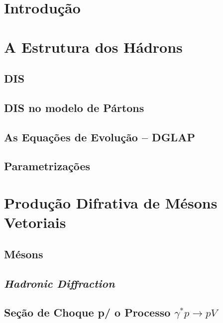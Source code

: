 \documentclass[aspectratio=169]{beamer}
\begin{document}
\usetikzlibrary{positioning}
\usetikzlibrary{shadows.blur, trees}

\newcommand{\autor}{Rodrigo Ribamar Silva do Nascimento}
\newcommand{\github}{github.com/physikices}
\newcommand{\email}{rodrigo.nascimento@edu.udesc.br}
\newcommand{\website}{}
\capa

\section{Introdução}
\section{A Estrutura dos Hádrons}
\subsection{DIS}
\subsection{DIS no modelo de Pártons}
\subsection{As Equações de Evolução -- DGLAP}
\subsection{Parametrizações}
\section{Produção Difrativa de Mésons Vetoriais}
\subsection{Mésons}
\subsection{\textit{Hadronic Diffraction}}
\subsection{Seção de Choque p/  o Processo \texorpdfstring{${\gamma^{*}p\to pV}$}{lg}}
\end{document}
